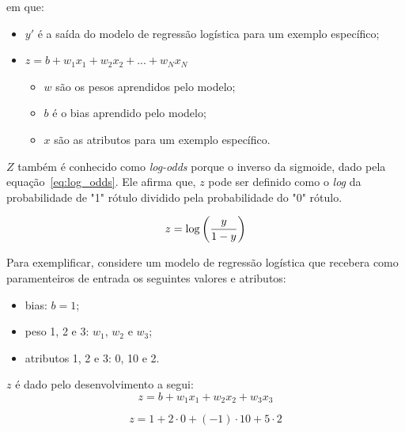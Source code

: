             em que:
            \begin{itemize}
                \item $y'$ é a saída do modelo de regressão logística para um exemplo específico;
                \item $z = b + w_{1}x_{1} + w_{2}x_{2} + ... + w_{N}x_{N}$
                \begin{itemize}
                    \item $w$ são os pesos aprendidos pelo modelo;
                    \item $b$ é o bias aprendido pelo modelo;
                    \item $x$ são as atributos para um exemplo específico.
                \end{itemize}
            \end{itemize}
            
            $Z$ também é conhecido como \textit{log-odds} porque o inverso da sigmoide, dado pela equação~\ref{eq:log_odds}. Ele afirma que, $z$ pode ser definido como o \textit{log} da probabilidade de "1"\textit{ }rótulo dividido pela probabilidade do "0"\textit{ }rótulo.
            
            \begin{equation}
                \centering
                z = \log\left(\frac{y}{1 - y}\right)
                \label{eq:log_odds}
            \end{equation}
            
            Para exemplificar, considere um modelo de regressão logística que recebera como paramenteiros de entrada os seguintes valores e atributos:
            
            \begin{itemize}
                \item bias: $b = 1$;
                \item peso 1, 2 e 3: $w_{1}$, $w_{2}$ e $w_{3}$;
                \item atributos 1, 2 e 3: 0, 10 e 2.
            \end{itemize}
            
            $z$ é dado pelo desenvolvimento a segui:
            \begin{equation*}
                z = b + w_{1}x_{1} + w_{2}x_{2} + w_{3}x_{3}
            \end{equation*}
            
            \begin{equation*}
                z = 1 + 2\cdot0 + (-1)\cdot10 + 5\cdot2
            \end{equation*}
            
